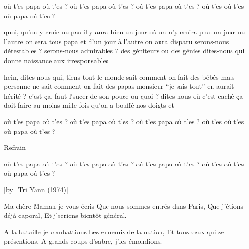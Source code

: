 \beginverse
où t’es papa où t’es ?
où t’es papa où t’es ?
où t’es papa où t’es ?
où t’es où t’es où papa où t’es ?
\\[bis]
\endverse

\beginverse
quoi, qu’on y croie ou pas
il y aura bien un jour où on n’y croira plus
un jour ou l’autre on sera tous papa
et d’un jour à l’autre on aura disparu
serons-nous détestables ?
serons-nous admirables ?
des géniteurs ou des génies
dites-nous qui donne naissance aux irresponsables
\endverse

\beginverse
hein, dites-nous qui, tiens
tout le monde sait comment on fait des bébés
mais personne ne sait comment on fait des papas
monsieur “je sais tout” en aurait hérité ?
c’est ça, faut l’sucer de son pouce ou quoi ?
dites-nous où c’est caché
ça doit faire au moins mille fois
qu’on a bouffé nos doigts et
\endverse

\beginverse
où t’es papa où t’es ?
où t’es papa où t’es ?
où t’es papa où t’es ?
où t’es où t’es où papa où t’es ?
\\[bis]
\endverse

\beginverse
Refrain\\[bis]
\endverse

\beginverse
où t’es papa où t’es ?
où t’es papa où t’es ?
où t’es papa où t’es ?
où t’es où t’es où papa où t’es ?
\\[Bis]
\endverse

[by={Tri Yann (1974)}]

\beginverse
Ma chère Maman je vous écris
Que nous sommes entrés dans Paris,
Que j'étions déjà caporal,
Et j'serions bientôt général.
\endverse

\beginverse
A la bataille je combattions
Les ennemis de la nation,
Et tous ceux qui se présentions,
A grands coups d'sabre, j'les émondions.
\endverse

